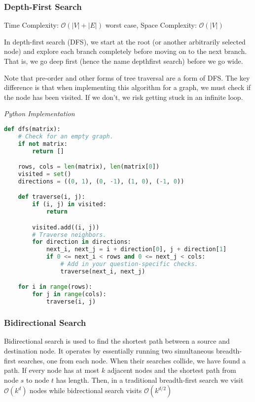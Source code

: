 \documentclass{article}
\newcommand{\bigO}{\ensuremath{\mathcal{O}}}
\begin{document}
    \subsubsection{Depth-First Search }
    Time Complexity: $\bigO(|V| + |E|)$ worst case, Space Complexity: $\bigO(|V|)$
    
    In depth-first search (DFS), we start at the root (or another arbitrarily selected node) and explore each branch completely before moving on to the next branch. That is, we go deep first (hence the name depthfirst search) before we go wide. 
    
    Note that pre-order and other forms of tree traversal are a form of DFS. The key difference is that when implementing this algorithm for a graph, we must check if the node has been visited. If we don't, we risk getting stuck in an infinite loop. 
    
\vspace{8pt} \emph{Python Implementation}
\begin{lstlisting}[language=Python]
def dfs(matrix):
    # Check for an empty graph.
    if not matrix:
        return []

    rows, cols = len(matrix), len(matrix[0])
    visited = set()
    directions = ((0, 1), (0, -1), (1, 0), (-1, 0))

    def traverse(i, j):
        if (i, j) in visited:
            return

        visited.add((i, j))
        # Traverse neighbors.
        for direction in directions:
            next_i, next_j = i + direction[0], j + direction[1]
            if 0 <= next_i < rows and 0 <= next_j < cols:
                # Add in your question-specific checks.
                traverse(next_i, next_j)

    for i in range(rows):
        for j in range(cols):
            traverse(i, j)

\end{lstlisting}

    \subsubsection{Bidirectional Search}
    Bidirectional search is used to find the shortest path between a source and destination node. It operates by essentially running two simultaneous breadth-first searches, one from each node. When their searches collide, we have found a path.  If every node has at most $k$ adjacent nodes and the shortest path from node $s$ to node $t$ has length. Then, in a traditional breadth-first search we visit $\mathcal{O}(k^d)$ nodes while bidrectional search visits $\mathcal{O}(k^{d/2})$
\end{document}
